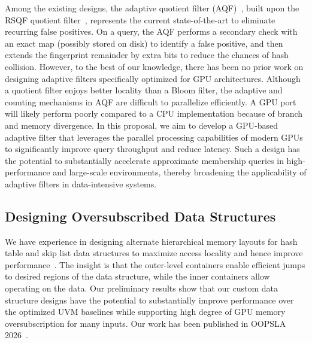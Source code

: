 \documentclass[12pt,a4paper]{article}
\begin{document}
Among the existing designs, the adaptive quotient filter (AQF)~\cite{aqf-sigmod}, built upon the RSQF quotient filter~\cite{rsqf}, represents the current state-of-the-art to eliminate recurring false positives. On a query, the AQF performs a secondary check with an exact map (possibly stored on disk) to identify a false positive, and then extends the fingerprint remainder by extra bits to reduce the chances of hash collision. However, to the best of our knowledge, there has been no prior work on designing adaptive filters specifically optimized for GPU architectures. Although a quotient filter enjoys better locality than a Bloom filter, the adaptive and counting mechanisms in AQF are difficult to parallelize efficiently. A \naive GPU port will likely perform poorly compared to a CPU implementation because of branch and memory divergence. In this proposal, we aim to develop a GPU-based adaptive filter that leverages the parallel processing capabilities of modern GPUs to significantly improve query throughput and reduce latency. Such a design has the potential to substantially accelerate approximate membership queries in high-performance and large-scale environments, thereby broadening the applicability of adaptive filters in data-intensive systems.

\subsection*{Designing Oversubscribed Data Structures}

We have experience in designing alternate hierarchical memory layouts for hash table
and skip list data structures to maximize access locality and hence improve
performance~\cite{gpu-ovs-ds-oopsla-2026}. The insight is that the outer-level containers enable efficient
jumps to desired regions of the data structure, while the inner containers allow
operating on the data. Our preliminary results show that our custom data
structure designs have the potential to substantially improve performance over
the optimized UVM baselines while supporting high degree of GPU memory
oversubscription for many inputs. Our work has been published in OOPSLA 2026~\cite{gpu-ovs-ds-oopsla-2026}.
\end{document}
